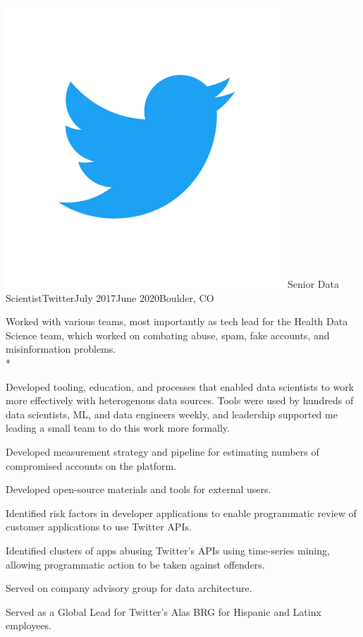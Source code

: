 \documentclass[print]{friggeri-cv} %
\newcommand{\twittericon}{\includegraphics[scale=0.05]{Twitter_Logo_Blue.png}}%
\begin{document}
\begin{job}
  {\twittericon}{Senior Data Scientist}{Twitter}{July 2017}{June 2020}{Boulder, CO}{
    Worked with various teams, most importantly as tech lead for the Health Data Science team,
    which worked on combating abuse, spam, fake accounts, and misinformation problems.\\*
    \begin{myitemize}
      \item Developed tooling, education, and processes that enabled data scientists to work more effectively with 
      heterogenous data sources. Tools were used by hundreds of data scientists, ML, and data engineers weekly, and leadership supported 
      me leading a small team to do this work more formally.
      \item Developed measurement strategy and pipeline for estimating numbers of compromised accounts on the platform.
      \item Developed open-source materials and tools for external users.\autocite{search_tweets_python}\autocite{do_more_with_twtter_data}
      \item Identified risk factors in developer applications to enable programmatic review of customer applications to use Twitter APIs.
      \item Identified clusters of apps abusing Twitter's APIs using time-series mining, allowing
      programmatic action to be taken against offenders.
      \item Served on company advisory group for data architecture.
      \item Served as a Global Lead for Twitter's Alas BRG for Hispanic and Latinx employees.

    \end{myitemize}
  }
\end{job}
\end{document}

